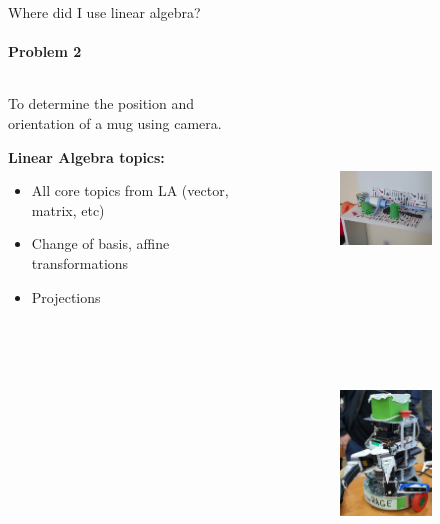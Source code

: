 \documentclass[aspectratio=169,notes]{beamer}
\begin{document}
\begin{frame}[t]{Where did I use linear algebra?}
    \framesubtitle{Problem 2}
    \vspace{-0.3cm}
    \begin{columns}[T,onlytextwidth]
        \begin{column}{0.34\textwidth}
            To determine the position and orientation of a mug using camera. \medskip

            \textbf{Linear Algebra topics:}
            \begin{itemize}
                \item All core topics from LA (vector, matrix, etc)
                \item Change of basis, affine transformations
                \item Projections
            \end{itemize}
        \end{column}
        \begin{column}{0.64\textwidth}
            \vspace{-0.4cm}
            \begin{figure}[H]
                \begin{subfigure}[c]{0.49\textwidth}
                    \centering\includegraphics[height=6cm,width=1\textwidth,keepaspectratio]{resources/output_Moment.jpg}
                    \label{fig:resources/output_Moment.jpg}
                \end{subfigure}
                \begin{subfigure}[c]{0.49\textwidth}
                    \centering\includegraphics[height=6cm,width=1\textwidth,keepaspectratio]{resources/2021-05-21 14-08-47.JPG}
                    \label{fig:resources/2021-05-21 14-08-47.JPG}
                \end{subfigure}
            \end{figure}
        \end{column}
    \end{columns}
\end{frame}
\end{document}
